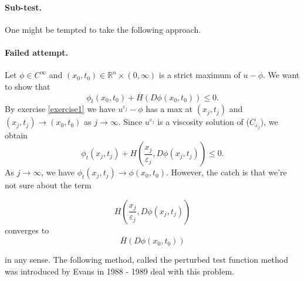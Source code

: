 \documentclass[12pt, oneside]{amsart}  	%
\begin{document}
\paragraph{\textbf{Sub-test.}} One might be tempted to take the following approach. 

\paragraph{\textbf{Failed attempt.}}
Let $\phi\in C^\infty$ and $(x_0, t_0)\in \mathbb{R}^n\times (0,\infty)$ is a strict maximum of $u-\phi$. We want to show that
\begin{equation*}
\phi_t(x_0,t_0) + \overline{H}(D\phi(x_0,t_0)) \leq 0.
\end{equation*}
By exercise \ref{exercise1} we have $u^{\varepsilon_j} - \phi$ has a max at $(x_j,t_j)$ and $(x_j,t_j)\longrightarrow (x_0,t_0)$ as $j\longrightarrow \infty$. Since $u^{\varepsilon_j}$ is a viscosity solution of ($C_{\varepsilon_j}$), we obtain
\begin{equation*}
\phi_t(x_j,t_j) + H\left(\frac{x_j}{\varepsilon_j}, D\phi(x_j,t_j)\right) \leq 0.
\end{equation*}
As $j\longrightarrow \infty$, we have $\phi_t(x_j,t_j)\longrightarrow \phi(x_0,t_0)$. However, the catch is that we're not sure about the term 

$$H\left(\frac{x_j}{\varepsilon_j}, D\phi(x_j,t_j)\right)$$ converges to $$\overline{H}(D\phi(x_0,t_0))$$

in any sense. The following method, called the perturbed test function method was introduced by Evans in 1988 - 1989 deal with this problem.
\end{document}
